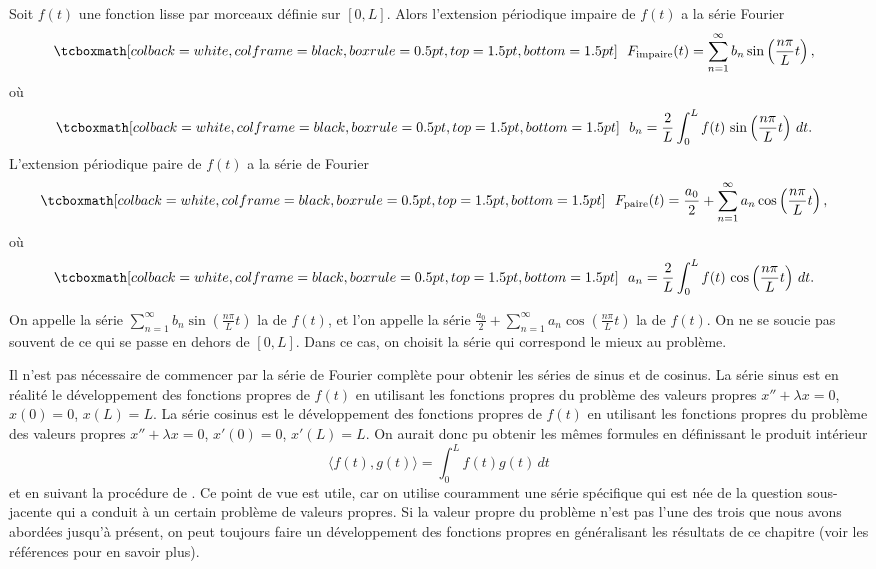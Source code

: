 \begin{theorem}
Soit $f(t)$ une fonction lisse par morceaux définie sur $[0,L]$.
Alors l'extension périodique impaire de $f(t)$ a la série Fourier
\begin{equation*}
\mybxbg{~~
F_{\text{impaire}}(t) = \sum_{n=1}^\infty b_n \sin \left( \frac{n \pi}{L} t
\right) ,
~~}
\end{equation*}
où
\begin{equation*}
\mybxbg{~~
b_n = 
\frac{2}{L} \int_{0}^L f(t)\, \sin \left( \frac{n \pi}{L} t \right) \, dt .
~~}
\end{equation*}
L'extension périodique paire de $f (t)$ a la série de Fourier
\begin{equation*}
\mybxbg{~~
F_{\text{paire}}(t) = \frac{a_0}{2} + \sum_{n=1}^\infty a_n \cos \left(
\frac{n \pi}{L} t \right) ,
~~}
\end{equation*}
où
\begin{equation*}
\mybxbg{~~
a_n = 
\frac{2}{L} \int_{0}^L f(t)\, \cos \left( \frac{n \pi}{L} t \right) \, dt .
~~}
\end{equation*}
\end{theorem}

On appelle la série $\sum_{n=1}^\infty b_n \sin \left( \frac{n \pi}{L} t\right)$ 
la \emph{} de  $f(t)$, et l'on appelle la série
$\frac{a_0}{2} + \sum_{n=1}^\infty a_n \cos \left( \frac{n \pi}{L} t \right)$ la \emph{} de $f(t)$.
On ne se soucie pas souvent de ce qui se passe en dehors de $[0, L]$. Dans ce cas,
on choisit la série qui correspond le mieux au problème.

Il n'est pas nécessaire de commencer par la série de Fourier complète pour obtenir
les séries de sinus et de cosinus. La série sinus est en réalité le développement des fonctions propres de $f(t)$ en utilisant les fonctions propres du problème des valeurs propres $x''+\lambda x = 0$, $x(0) = 0$, $x(L) = L$.
La série cosinus est le développement des fonctions propres de $f(t)$ en utilisant les fonctions propres du problème des valeurs propres $x''+\lambda x = 0$, $x'(0) = 0$, $x'(L) = L$.
On aurait donc pu obtenir les mêmes formules en définissant le produit intérieur
\begin{equation*}
\langle f(t), g(t) \rangle = \int_0^L f(t) g(t) \, dt
\end{equation*}
et en suivant la procédure de . Ce point de vue est
utile, car on utilise couramment une série spécifique qui est née de la question sous-jacente qui a conduit à un certain problème de valeurs propres. Si la valeur propre du problème n'est pas l'une des trois que nous avons abordées jusqu'à présent, on peut toujours faire un développement des fonctions propres en généralisant les résultats de ce chapitre (voir les références pour en savoir plus).

